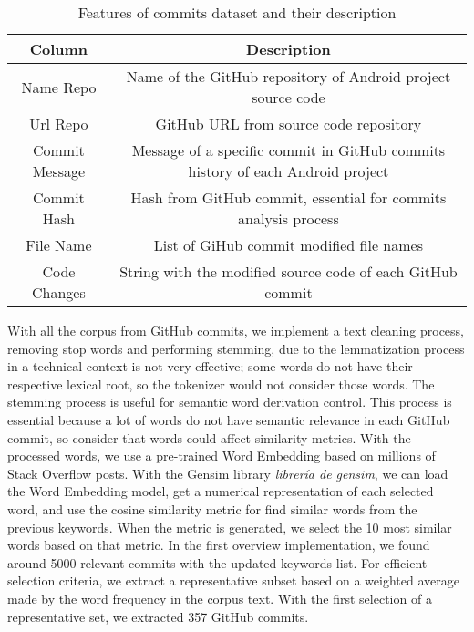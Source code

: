 \begin{table}[H]
    \centering
    \begin{tabular}{|c|c|}
        \hline
        Column & Description \\
        \hline
        Name Repo & Name of the GitHub repository of Android project source code \\
        \hline
        Url Repo & GitHub URL from source code repository \\
        \hline
       Commit Message & Message of a specific commit in GitHub commits history of each Android project \\
       \hline
       Commit Hash & Hash from GitHub commit, essential for commits analysis process \\
       \hline
       File Name & List of GiHub commit modified file names \\
       \hline
       Code Changes & String with the modified source code of each GitHub commit \\
       \hline
    \end{tabular}
    \caption{Features of commits dataset and their description}
    \label{tab:my_label}
\end{table}

With all the corpus from GitHub commits, we implement a text cleaning process, removing stop words and performing stemming, due to the lemmatization process in a technical context is not very effective; some words do not have their respective lexical root, so the tokenizer would not consider those words. The stemming process is useful for semantic word derivation control. This process is essential because a lot of words do not have semantic relevance in each GitHub commit, so consider that words could affect similarity metrics. With the processed words, we use a pre-trained Word Embedding based on millions of Stack Overflow posts. With the Gensim library \emph{librería de gensim}, we can load the Word Embedding model, get a numerical representation of each selected word, and use the cosine similarity metric for find similar words from the previous keywords. When the metric is generated, we select the 10 most similar words based on that metric.
In the first overview implementation, we found around 5000 relevant commits with the updated keywords list. For efficient selection criteria, we extract a representative subset based on a weighted average made by the word frequency in the corpus text. With the first selection of a representative set, we extracted 357 GitHub commits. 


